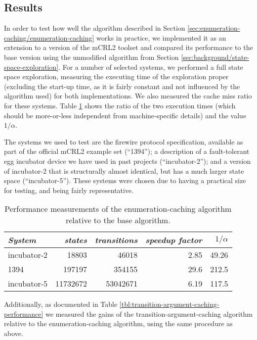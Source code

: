\documentclass[a4paper]{article}
\begin{document}
\subsection{Results}
\label{sec:enumeration-caching/results}
In order to test how well the algorithm described in Section \ref{sec:enumeration-caching/enumeration-caching} works in practice, we implemented it as an extension to a version of the mCRL2 toolset and compared its performance to the base version using the unmodified algorithm from Section \ref{sec:background/state-space-exploration}. For a number of selected systems, we performed a full state space exploration, measuring the executing time of the exploration proper (excluding the start-up time, as it is fairly constant and not influenced by the algorithm used) for both implementations. We also measured the cache miss ratio for these systems. Table \ref{tbl:enumeration-caching-performance} shows the ratio of the two execution times (which should be more-or-less independent from machine-specific details) and the value $1 / \alpha$.

The systems we used to test are the firewire protocol specification, available as part of the official mCRL2 example set (``1394''); a description of a fault-tolerant egg incubator device we have used in past projects (``incubator-2''); and a version of incubator-2 that is structurally almost identical, but has a much larger state space (``incubator-5''). These systems were chosen due to having a practical size for testing, and being fairly representative.

\begin{table}[h]
\begin{center}
\begin{tabular}{l|rrrr}
\emph{System} & \emph{states} & \emph{transitions} & \emph{speedup factor} & \emph{$1 / \alpha$} \\
\hline
incubator-2 & 18803 & 46018 & 2.85 & 49.26 \\
1394 & 197197 & 354155 & 29.6 & 212.5 \\
incubator-5 & 11732672 & 53042671 & 6.19 & 117.5 \\
\end{tabular}
\caption{Performance measurements of the enumeration-caching algorithm relative to the base algorithm.}
\label{tbl:enumeration-caching-performance}
\end{center}
\end{table}

Additionally, as documented in Table \ref{tbl:transition-argument-caching-performance} we measured the gains of the transition-argument-caching algorithm relative to the enumeration-caching algorithm, using the same procedure as above.
\end{document}
